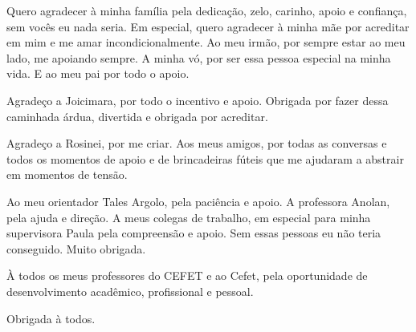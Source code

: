 %
%

\begin{agradecimentos}

Quero agradecer à minha família pela dedicação, zelo, carinho, apoio e confiança, sem vocês eu nada seria. Em especial, quero agradecer à minha mãe por acreditar em mim e me amar incondicionalmente. Ao meu irmão, por sempre estar ao meu lado, me apoiando sempre. A minha vó, por ser essa pessoa especial na minha vida. E ao meu pai por todo o apoio.

Agradeço a Joicimara, por todo o incentivo e apoio. Obrigada por fazer dessa caminhada árdua, divertida e obrigada por acreditar.

Agradeço a Rosinei, por me criar. Aos meus amigos, por todas as conversas e todos os momentos de apoio e de brincadeiras fúteis que me ajudaram a abstrair em momentos de tensão.

Ao meu orientador Tales Argolo, pela paciência e apoio. A professora Anolan, pela ajuda e direção. A meus colegas de trabalho, em especial para minha supervisora Paula pela compreensão e apoio. Sem essas pessoas eu não teria conseguido. Muito obrigada.

À todos os meus professores do CEFET e ao Cefet, pela oportunidade de desenvolvimento acadêmico, profissional e pessoal.

Obrigada à todos.   
\end{agradecimentos}
